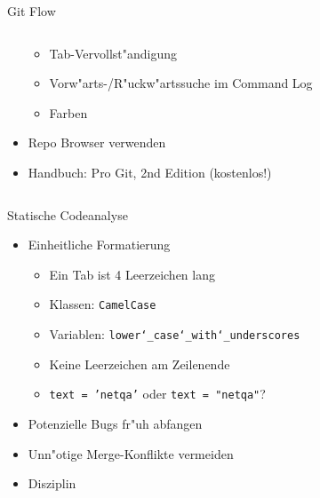 \documentclass{beamer}
\begin{document}
\begin{frame}{Git Flow}
\begin{columns}[T]
\begin{column}{.8\textwidth}
\begin{itemize}
					\begin{itemize}
						\item Tab-Vervollst"andigung
						\item Vorw"arts-/R"uckw"artssuche im Command Log
						\item Farben
					\end{itemize}
				\item Repo Browser verwenden
				\item Handbuch: Pro Git, 2nd Edition (kostenlos!)
			\end{itemize}
		\end{column}
	\end{columns}
\end{frame}

\begin{frame}{Statische Codeanalyse}
	\begin{itemize}
		\item Einheitliche Formatierung
			\begin{itemize}
				\item Ein Tab ist 4 Leerzeichen lang
				\item Klassen: \texttt{CamelCase}
				\item Variablen: \texttt{lower\char`_case\char`_with\char`_underscores}
				\item Keine Leerzeichen am Zeilenende
				\item \texttt{text = 'netqa'} oder \texttt{text = "netqa"}?
			\end{itemize}
		\item Potenzielle Bugs fr"uh abfangen
		\item Unn"otige Merge-Konflikte vermeiden
		\item Disziplin
	\end{itemize}
\end{frame}
\end{document}
